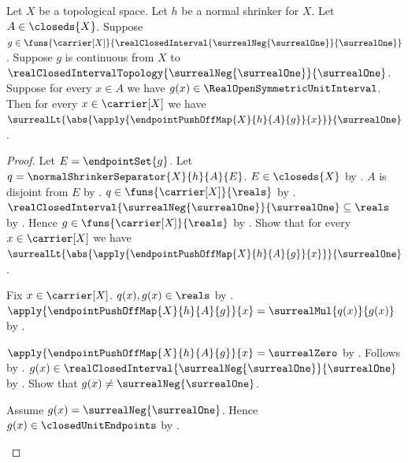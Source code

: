 \begin{theorem}\label{endpoint_push_off_map_strict_abs_bound}
    Let $X$ be a topological space.
    Let $h$ be a normal shrinker for $X$.
    Let $A\in\closeds{X}$.
    Suppose
        $g\in\funs{\carrier[X]}
            {\realClosedInterval
                {\surrealNeg{\surrealOne}}{\surrealOne}}$.
    Suppose $g$ is continuous from $X$ to
        $\realClosedIntervalTopology
            {\surrealNeg{\surrealOne}}{\surrealOne}$.
    Suppose for every $x\in A$ we have
        $g(x)\in\RealOpenSymmetricUnitInterval$.
    Then for every $x\in\carrier[X]$ we have
        $\surrealLt{
            \abs{\apply{\endpointPushOffMap{X}{h}{A}{g}}{x}}}
            {\surrealOne}$.
\end{theorem}
\begin{proof}
    Let $E=\endpointSet{g}$.
    Let $q=\normalShrinkerSeparator{X}{h}{A}{E}$.
    $E\in\closeds{X}$ by .
    $A$ is disjoint from $E$
        by .
    $q\in\funs{\carrier[X]}{\reals}$
        by .
    $\realClosedInterval
        {\surrealNeg{\surrealOne}}{\surrealOne}\subseteq\reals$
        by .
    Hence $g\in\funs{\carrier[X]}{\reals}$
        by .
    Show that for every $x\in\carrier[X]$ we have
        $\surrealLt{
            \abs{\apply{\endpointPushOffMap{X}{h}{A}{g}}{x}}}
            {\surrealOne}$.
    \begin{subproof}
        Fix $x\in\carrier[X]$.
        $q(x),g(x)\in\reals$ by .
        $\apply{\endpointPushOffMap{X}{h}{A}{g}}{x}
            =\surrealMul{q(x)}{g(x)}$
            by .
        \begin{byCase}
            $\apply{\endpointPushOffMap{X}{h}{A}{g}}{x}
                =\surrealZero$
                by .
            Follows by
                .
            $g(x)\in\realClosedInterval
                {\surrealNeg{\surrealOne}}{\surrealOne}$
                by .
            Show that $g(x)\neq\surrealNeg{\surrealOne}$.
            \begin{subproof}
                Assume $g(x)=\surrealNeg{\surrealOne}$.
                Hence $g(x)\in\closedUnitEndpoints$
                    by
                    .

\end{subproof}
\end{byCase}
\end{subproof}
\end{proof}
